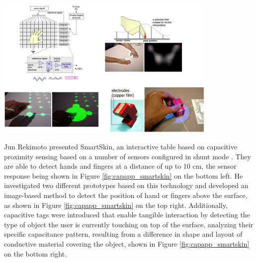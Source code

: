 \begin{minipage}{\linewidth}
\centering
\includegraphics[width=0.8\textwidth]{images/capapp_smartskin}
\label{fig:capapp_smartskin}
\end{minipage}

Jun Rekimoto presented SmartSkin, an interactive table based on capacitive proximity sensing based on a number of sensors configured in shunt mode \cite{rekimoto2002smartskin}. They are able to detect hands and fingers at a distance of up to 10 cm, the sensor response being shown in Figure \ref{fig:capapp_smartskin} on the bottom left. He investigated two different prototypes based on this technology and developed an image-based method to detect the position of hand or fingers above the surface, as shown in Figure \ref{fig:capapp_smartskin} on the top right. Additionally, capacitive tags were introduced that enable tangible interaction by detecting the type of object the user is currently touching on top of the surface, analyzing their specific capacitance pattern, resulting from a difference in shape and layout of conductive material covering the object, shown in Figure \ref{fig:capapp_smartskin} on the bottom right.


